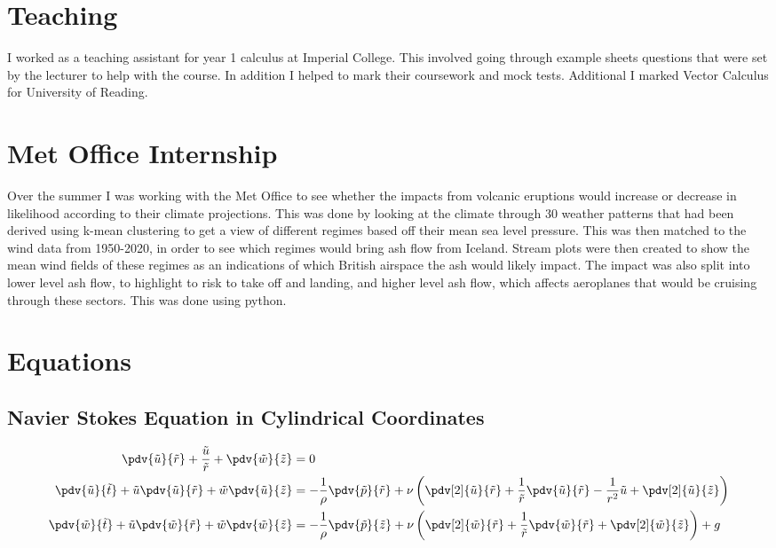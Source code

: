 \documentclass[12pt]{article}
\begin{document}
\section{Teaching}
I worked as a teaching assistant for year 1 calculus at Imperial College. This involved going through example sheets questions that were set by the lecturer to help with the course. In addition I helped to mark their coursework and mock tests. Additional I marked Vector Calculus for University of Reading.

\section{Met Office Internship}
Over the summer I was working with the Met Office to see whether the impacts from volcanic eruptions would increase or decrease in likelihood according to their climate projections. This was done by looking at the climate through 30 weather patterns that had been derived using k-mean clustering to get a view of different regimes based off their mean sea level pressure. This was then matched to the wind data from 1950-2020, in order to see which regimes would bring ash flow from Iceland. Stream plots were then created to show the mean wind fields of these regimes as an indications of which British airspace the ash would likely impact. The impact was also split into lower level ash flow, to highlight to risk to take off and landing, and higher level ash flow, which affects aeroplanes that would be cruising through these sectors. This was done using python.

\appendix
\section{Equations}
\subsection{Navier Stokes Equation in Cylindrical Coordinates \label{eqs}}

\begin{align}
\pdv{\tilde u}{\tilde r}+\frac{\tilde u}{\tilde r}+\pdv{\tilde w}{\tilde z}&=0\\
\pdv{\tilde u}{\tilde t}+\tilde u\pdv{\tilde u}{\tilde r}+\tilde w\pdv{\tilde u}{\tilde z}&=-\frac{1}{\rho}\pdv{\tilde p}{\tilde r}+\nu\left(\pdv[2]{\tilde u}{\tilde r}+\frac{1}{\tilde r}\pdv{\tilde u}{\tilde r}-\frac{1}{r^2}\tilde u+\pdv[2]{\tilde u}{\tilde z}\right)\\
\pdv{\tilde w}{\tilde t}+\tilde u\pdv{\tilde w}{\tilde r}+\tilde w\pdv{\tilde w}{\tilde z}&=-\frac{1}{\rho}\pdv{\tilde p}{\tilde z}+\nu\left(\pdv[2]{\tilde w}{\tilde r}+\frac{1}{\tilde r}\pdv{\tilde w}{\tilde r}+\pdv[2]{\tilde w}{\tilde z}\right) + g 
\end{align}
\end{document}
